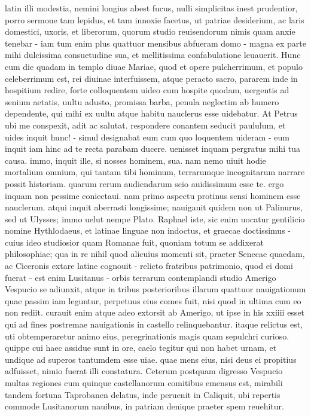 \documentclass[12pt,a4paper]{book}
\renewenvironment{latin}
    	{\begin{hyphenrules}{latin}}
    	{\end{hyphenrules}}
\begin{document}
\begin{pages}
\begin{Leftside}
\begin{latin}
illi modestia, nemini longius abest fucus, nulli simplicitas inest prudentior, 
porro sermone tam lepidus, et tam innoxie facetus, ut patriae desiderium, ac 
laris domestici, uxoris, et liberorum, quorum studio reuisendorum nimis quam 
anxie tenebar - iam tum enim plus quattuor mensibus abfueram domo - magna ex 
parte mihi dulcissima consuetudine sua, et mellitissima confabulatione 
leuauerit. 
\pend
\pstart
Hunc cum die quadam in templo diuae Mariae, quod et opere pulcherrimum, et 
populo celeberrimum est, rei diuinae interfuissem, atque peracto sacro, pararem 
inde in hospitium redire, forte colloquentem uideo cum hospite quodam, uergentis 
ad senium aetatis, uultu adusto, promissa barba, penula neglectim ab humero 
dependente, qui mihi ex uultu atque habitu nauclerus esse uidebatur. 
At Petrus ubi me conspexit, adit ac salutat. respondere conantem seducit 
paululum, et uides inquit hunc! - simul designabat eum cum quo loquentem uideram 
- eum inquit iam hinc ad te recta parabam ducere. uenisset inquam pergratus mihi 
tua causa. immo, inquit ille, si nosses hominem, sua. nam nemo uiuit hodie 
mortalium omnium, qui tantam tibi hominum, terrarumque incognitarum narrare 
possit historiam. quarum rerum audiendarum scio auidissimum esse te. ergo inquam 
non pessime coniectaui. nam primo aspectu protinus sensi hominem esse nauclerum. 
atqui inquit aberrasti longissime; nauigauit quidem non ut Palinurus, sed ut 
Ulysses; immo uelut nempe Plato. 
\pend
\pstart
Raphael iste, sic enim uocatur gentilicio 
nomine Hythlodaeus, et latinae linguae non indoctus, et graecae doctissimus - 
cuius ideo studiosior quam Romanae fuit, quoniam totum se addixerat 
philosophiae; qua in re nihil quod alicuius momenti sit, praeter Senecae 
quaedam, ac Ciceronis extare latine cognouit - relicto fratribus patrimonio, 
quod ei domi fuerat - est enim Lusitanus - orbis terrarum contemplandi studio 
Amerigo Vespucio se adiunxit, atque in tribus posterioribus illarum quattuor 
nauigationum quae passim iam leguntur, perpetuus eius comes fuit, nisi quod in 
ultima cum eo non rediit. curauit enim atque adeo extorsit ab Amerigo, ut ipse 
in his xxiiii esset qui ad fines postremae nauigationis in castello 
relinquebantur. itaque relictus est, uti obtemperaretur animo eius, 
peregrinationis magis quam sepulchri curioso. quippe cui haec assidue sunt in 
ore, caelo tegitur qui non habet urnam, et undique ad superos tantumdem esse 
uiae. quae mens eius, nisi deus ei propitius adfuisset, nimio fuerat illi 
constatura. 
\pend
\pstart
Ceterum postquam digresso Vespucio multas regiones cum quinque castellanorum 
comitibus emensus est, mirabili tandem fortuna Taprobanen delatus, inde peruenit 
in Caliquit, ubi repertis commode Lusitanorum nauibus, in patriam denique 
praeter spem reuehitur. 
\pend
	\endnumbering
    \end{latin}
    \end{Leftside}


\end{pages}
\end{document}
